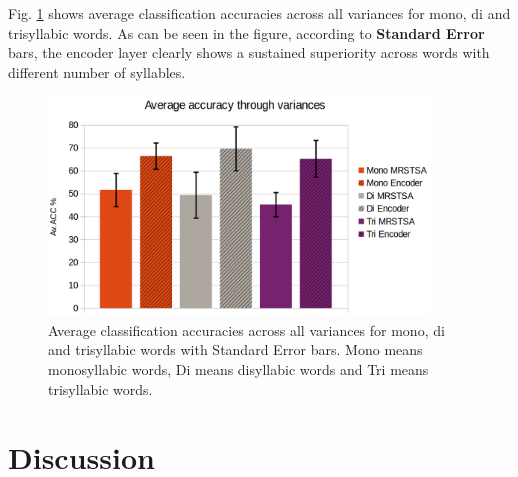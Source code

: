 \documentclass[10pt,letterpaper]{article}
\begin{document}
Fig. \ref{fig:AV_ACC} shows average classification accuracies across all variances for mono, di and trisyllabic words.
As can be seen in the figure, according to \textbf{Standard Error} bars, the encoder layer clearly shows
a sustained superiority across words with different number of syllables.
 

\begin{figure}[h!]
    \centering
    \includegraphics[width=0.9\textwidth]{AV_ACC.png}
    \caption{Average classification accuracies across all variances for mono, di and trisyllabic words with Standard Error bars.
    Mono means monosyllabic words, Di means disyllabic words and Tri means trisyllabic words.}
    \label{fig:AV_ACC}
\end{figure}













\section*{Discussion}

\end{document}
